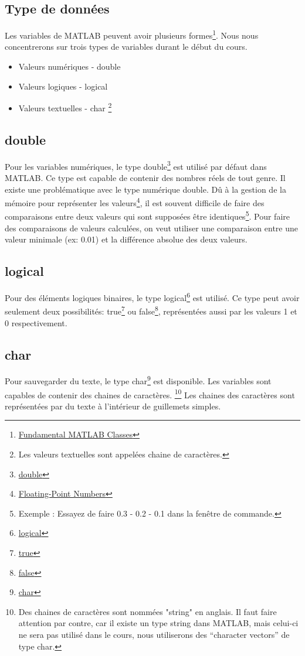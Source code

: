 \documentclass{tufte-handout}
\begin{document}
\subsection{Type de données}
Les variables de MATLAB peuvent avoir plusieurs formes\footnote{\href{https://www.mathworks.com/help/matlab/matlab_prog/fundamental-matlab-classes.html}{Fundamental MATLAB Classes}}. Nous nous concentrerons sur trois types de variables durant le début du cours.
\begin{itemize}
    \item Valeurs numériques - double
    \item Valeurs logiques - logical
    \item Valeurs textuelles - char \footnote{Les valeurs textuelles sont appelées chaine de caractères.}
\end{itemize}
\subsection{double}
Pour les variables numériques, le type double\footnote{\href{https://www.mathworks.com/help/matlab/ref/double.html}{double}} est utilisé par défaut dans MATLAB. Ce type est capable de contenir des nombres réels de tout genre.
Il existe une problématique avec le type numérique double. Dû à la gestion de la mémoire pour représenter les valeurs\footnote{\href{https://www.mathworks.com/help/matlab/matlab_prog/floating-point-numbers.html}{Floating-Point Numbers}}, il est souvent difficile de faire des comparaisons entre deux valeurs qui sont supposées être identiques\footnote{Exemple : Essayez de faire 0.3 - 0.2 - 0.1 dans la fenêtre de commande.}. Pour faire des comparaisons de valeurs calculées, on veut utiliser une comparaison entre une valeur minimale (ex: 0.01) et la différence absolue des deux valeurs.
\subsection{logical}
Pour des éléments logiques binaires, le type logical\footnote{\href{https://www.mathworks.com/help/matlab/ref/logical.html}{logical}} est utilisé. Ce type peut avoir seulement deux possibilités: true\footnote{\href{https://www.mathworks.com/help/matlab/ref/true.html}{true}} ou false\footnote{\href{https://www.mathworks.com/help/matlab/ref/false.html}{false}}, représentées aussi par les valeurs 1 et 0 respectivement.
\subsection{char}
Pour sauvegarder du texte, le type char\footnote{\href{https://www.mathworks.com/help/matlab/ref/char.html}{char}} est disponible. Les variables sont capables de contenir des chaines de caractères.
\footnote{Des chaines de caractères sont nommées "string" en anglais. Il faut faire attention par contre, car il existe un type string dans MATLAB, mais celui-ci ne sera pas utilisé dans le cours, nous utiliserons des “character vectors” de type char.}
Les chaines des caractères sont représentées par du texte à l'intérieur de guillemets simples.
\end{document}
